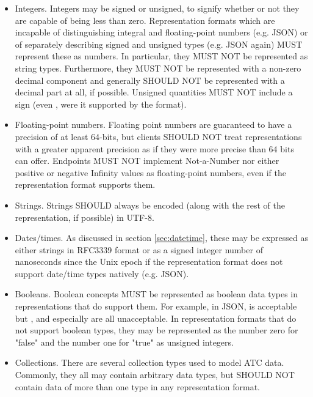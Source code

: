\begin{itemize}
	\item Integers. Integers may be signed or unsigned, to signify whether or not
	they are capable of being less than zero. Representation formats which are
	incapable of distinguishing integral and floating-point numbers (e.g. JSON)
	or of separately describing signed and unsigned types (e.g. JSON again) MUST
	represent these as numbers. In particular, they MUST NOT be represented as
	string types. Furthermore, they MUST NOT be represented with a non-zero
	decimal component and generally SHOULD NOT be represented with a decimal part
	at all, if possible. Unsigned quantities MUST NOT include a sign (even
	\code{+}, were it supported by the format).

	\item Floating-point numbers. Floating point numbers are guaranteed to have a
	precision of at least 64-bits, but clients SHOULD NOT treat representations
	with a greater apparent precision as if they were more precise than 64 bits
	can offer. Endpoints MUST NOT implement Not-a-Number nor either positive or
	negative Infinity values as floating-point numbers, even if the
	representation format supports them.

	\item Strings. Strings SHOULD always be encoded (along with the rest of the
	representation, if possible) in UTF-8.

	\item Dates/times. As discussed in section \ref{sec:datetime}, these may be
	expressed as either strings in RFC3339 format or as a signed integer number
	of nanoseconds since the Unix epoch if the representation format does not
	support date/time types natively (e.g. JSON).

	\item Booleans. Boolean concepts MUST be represented as boolean data types in
	representations that do support them. For example, in JSON,
	 is acceptable but ,
	 and especially  are all unacceptable.
	In representation formats that do not support boolean types, they may be
	represented as the number zero for "false" and the number one for "true" as
	unsigned integers.

	\item Collections. There are several collection types used to model ATC data. Commonly, they all may contain arbitrary data types, but SHOULD NOT contain data of more than one type in any representation format.


\end{itemize}
